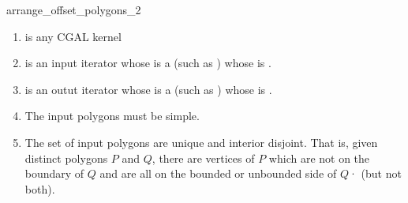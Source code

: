 \begin{ccRefFunction}{arrange_offset_polygons_2}
\begin{enumerate} 
   \item    {} is any CGAL kernel
   \item    {} is an input iterator whose  is a 
            (such as ) whose  is .
   \item    {} is an outut iterator whose  is a 
            (such as ) whose  is .
   \item    The input polygons must be simple.
   \item    The set of input polygons are unique and interior disjoint. That is, given distinct polygons
            $P$ and $Q$, there are vertices of $P$ which are not on the boundary of $Q$ and are all on the
            bounded or unbounded side of $Q$· (but not both). 
\end{enumerate}


\ccSeeAlso
{}\\
 \\

\end{ccRefFunction}


